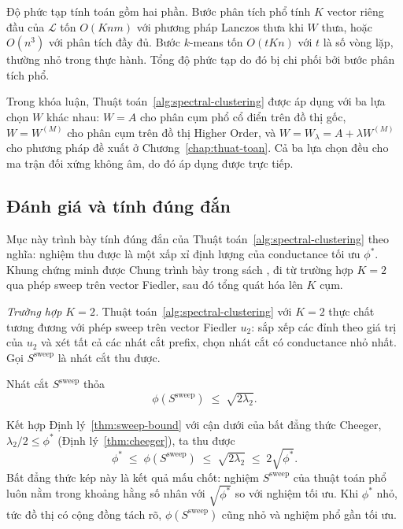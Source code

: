 Độ phức tạp tính toán gồm hai phần. Bước phân tích phổ tính $K$ vector riêng đầu của $\mathcal{L}$ tốn $O(K n m)$ với phương pháp Lanczos thưa khi $W$ thưa, hoặc $O(n^3)$ với phân tích đầy đủ. Bước $k$-means tốn $O(t K n)$ với $t$ là số vòng lặp, thường nhỏ trong thực hành. Tổng độ phức tạp do đó bị chi phối bởi bước phân tích phổ.

Trong khóa luận, Thuật toán~\ref{alg:spectral-clustering} được áp dụng với ba lựa chọn $W$ khác nhau: $W = A$ cho phân cụm phổ cổ điển trên đồ thị gốc, $W = W^{(M)}$ cho phân cụm trên đồ thị Higher Order, và $W = W_\lambda = A + \lambda W^{(M)}$ cho phương pháp đề xuất ở Chương~\ref{chap:thuat-toan}. Cả ba lựa chọn đều cho ma trận đối xứng không âm, do đó áp dụng được trực tiếp.

\subsection{Đánh giá và tính đúng đắn}
\label{subsec:correctness}

Mục này trình bày tính đúng đắn của Thuật toán~\ref{alg:spectral-clustering} theo nghĩa: nghiệm thu được là một xấp xỉ định lượng của conductance tối ưu $\phi^*$. Khung chứng minh được Chung trình bày trong sách \cite{chung1997}, đi từ trường hợp $K = 2$ qua phép sweep trên vector Fiedler, sau đó tổng quát hóa lên $K$ cụm.

\emph{Trường hợp $K = 2$.} Thuật toán~\ref{alg:spectral-clustering} với $K = 2$ thực chất tương đương với phép sweep trên vector Fiedler $u_2$: sắp xếp các đỉnh theo giá trị của $u_2$ và xét tất cả các nhát cắt prefix, chọn nhát cắt có conductance nhỏ nhất. Gọi $S^{\mathrm{sweep}}$ là nhát cắt thu được.

\begin{theorem}
\label{thm:sweep-bound}
Nhát cắt $S^{\mathrm{sweep}}$ thỏa
\[
    \phi(S^{\mathrm{sweep}}) \;\leq\; \sqrt{2 \lambda_2}.
\]
\end{theorem}

Kết hợp Định lý~\ref{thm:sweep-bound} với cận dưới của bất đẳng thức Cheeger, $\lambda_2 / 2 \leq \phi^*$ (Định lý~\ref{thm:cheeger}), ta thu được
\[
    \phi^* \;\leq\; \phi(S^{\mathrm{sweep}}) \;\leq\; \sqrt{2 \lambda_2} \;\leq\; 2 \sqrt{\phi^*}.
\]
Bất đẳng thức kép này là kết quả mấu chốt: nghiệm $S^{\mathrm{sweep}}$ của thuật toán phổ luôn nằm trong khoảng hằng số nhân với $\sqrt{\phi^*}$ so với nghiệm tối ưu. Khi $\phi^*$ nhỏ, tức đồ thị có cộng đồng tách rõ, $\phi(S^{\mathrm{sweep}})$ cũng nhỏ và nghiệm phổ gần tối ưu.

